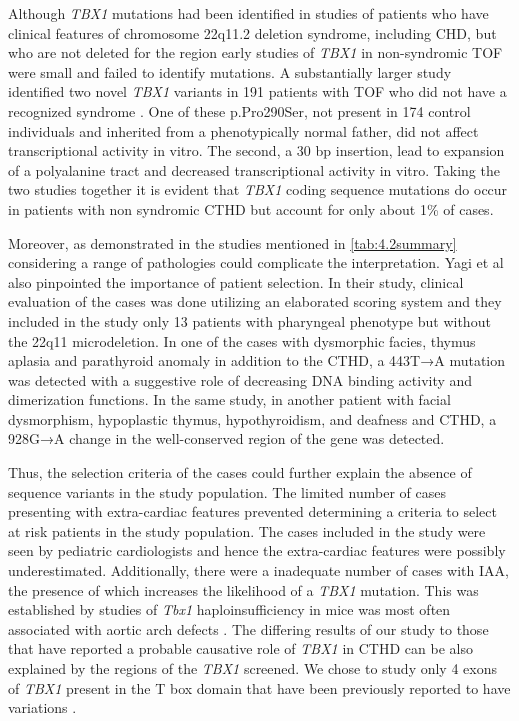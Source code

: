 \begin{refsection}
Although \textit{TBX1} mutations had been identified in studies of patients who have clinical features of chromosome 22q11.2 deletion syndrome, including CHD, but who are not deleted for the region \cite{gong2001mutation, yagi2003role, paylor2006tbx1, zweier2007human} early studies of \textit{TBX1} in non-syndromic TOF were small and failed to identify mutations. A substantially larger study identified two novel \textit{TBX1} variants in 191 patients with TOF who did not have a recognized syndrome \cite{rauch2004assessment}. One of these p.Pro290Ser, not present in 174 control individuals and inherited from a phenotypically normal father, did not affect transcriptional activity in vitro. The second, a 30 bp insertion, lead to expansion of a polyalanine tract and decreased transcriptional activity in vitro. Taking the two studies together it is evident that \textit{TBX1} coding sequence mutations do occur in patients with non syndromic CTHD but account for only about 1\% of cases.

Moreover, as demonstrated in the studies mentioned in \cref{tab:4.2summary} considering a range of pathologies could complicate the interpretation. Yagi et al \cite{yagi2003role} also pinpointed the importance of patient selection. In their study, clinical evaluation of the cases was done utilizing an elaborated scoring system and they included in the study only 13 patients with pharyngeal phenotype but without the 22q11 microdeletion. In one of the cases with dysmorphic facies, thymus aplasia and parathyroid anomaly in addition to the CTHD, a 443T→A mutation was detected with a suggestive role of decreasing DNA binding activity and dimerization functions. In the same study, in another patient with facial dysmorphism, hypoplastic thymus, hypothyroidism, and deafness and CTHD, a 928G→A change in the well-conserved region of the gene was detected. 

Thus, the selection criteria of the cases could further explain the absence of sequence variants in the study population. The limited number of cases presenting with extra-cardiac features prevented determining a criteria to select at risk patients in the study population. The cases included in the study were seen by pediatric cardiologists and hence the extra-cardiac features were possibly underestimated. Additionally, there were a inadequate number of cases with IAA, the presence of which increases the likelihood of a \textit{TBX1} mutation. This was established by studies of \textit{Tbx1} haploinsufficiency in mice was most often associated with aortic arch defects \cite{lindsay2001tbx1}. The differing results of our study to those that have reported a probable causative role of \textit{TBX1} in CTHD can be also explained by the regions of the \textit{TBX1} screened. We chose to study only 4 exons of \textit{TBX1} present in the T box domain that have been previously reported to have variations \cite{Cabuk2007}.


\end{refsection}
